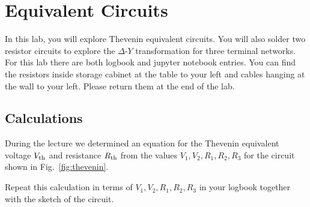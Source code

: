 
\chapter{Equivalent Circuits}

In this lab, you will explore Thevenin equivalent circuits. You will also solder two resistor circuits to explore the $\Delta$-$Y$ transformation for three terminal networks. For this lab there are both logbook and jupyter notebook entries. You can find the resistors inside storage cabinet at the table to your left and cables hanging at the wall to your left. Please return them at the end of the lab. 


\section{Calculations}

\noindent
During the lecture we determined an equation for the Thevenin equivalent voltage $V_{\rm  th}$ and resistance $R_{\rm th}$ from the values $V_1, V_2, R_1, R_2, R_3$ for the circuit shown in Fig.~\ref{fig:thevenin}.  
\begin{measurement} Repeat this calculation in terms of  $V_1, V_2, R_1, R_2, R_3$ in your logbook together with the sketch of the circuit.\end{measurement}



